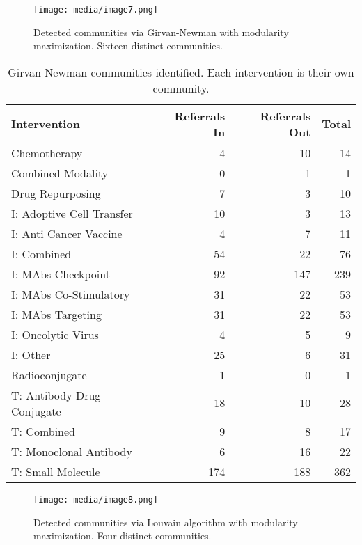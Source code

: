 \documentclass{article}
\begin{document}
\begin{figure}
\centering
\texttt{[image: media/image7.png]}
\caption{Detected communities via Girvan-Newman with
modularity maximization. Sixteen distinct communities.}
\end{figure}

\begin{table}[htbp]
\centering
\begin{tabular}{lrrr}
\toprule
Intervention & Referrals In & Referrals Out & Total \\ 
\midrule
Chemotherapy & 4 & 10 & 14 \\ 
Combined Modality & 0 & 1 & 1 \\ 
Drug Repurposing & 7 & 3 & 10 \\ 
I: Adoptive Cell Transfer & 10 & 3 & 13 \\ 
I: Anti Cancer Vaccine & 4 & 7 & 11 \\ 
I: Combined & 54 & 22 & 76 \\ 
I: MAbs Checkpoint & 92 & 147 & 239 \\ 
I: MAbs Co-Stimulatory & 31 & 22 & 53 \\ 
I: MAbs Targeting & 31 & 22 & 53 \\ 
I: Oncolytic Virus & 4 & 5 & 9 \\ 
I: Other & 25 & 6 & 31 \\ 
Radioconjugate & 1 & 0 & 1 \\ 
T: Antibody-Drug Conjugate & 18 & 10 & 28 \\ 
T: Combined & 9 & 8 & 17 \\ 
T: Monoclonal Antibody & 6 & 16 & 22 \\ 
T: Small Molecule & 174 & 188 & 362 \\ 
\bottomrule
\end{tabular}
\caption{Girvan-Newman communities identified. Each intervention is their own community.}
\end{table}

\begin{figure}
\centering
\texttt{[image: media/image8.png]}

\caption{Detected communities via Louvain algorithm with
modularity maximization. Four distinct communities.}
\end{figure}
\end{document}
